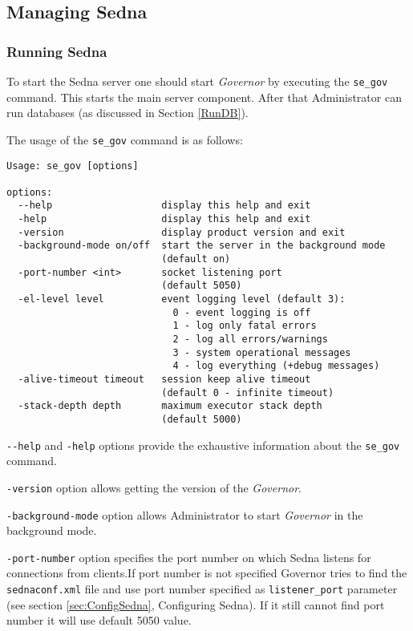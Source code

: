 \documentclass[a4paper,12pt]{article}
\begin{document}
\subsection{Managing Sedna}
\subsubsection{Running Sedna}
\label{StartSedna}

To start the Sedna server one should start \emph{Governor} by executing the
\verb!se_gov! command. This starts the main server component. After that
Administrator can run databases (as discussed in Section \ref{RunDB}).

The usage of the \verb!se_gov! command is as follows:

\begin{verbatim}
Usage: se_gov [options]

options:
  --help                   display this help and exit
  -help                    display this help and exit
  -version                 display product version and exit
  -background-mode on/off  start the server in the background mode
                           (default on)
  -port-number <int>       socket listening port
                           (default 5050)
  -el-level level          event logging level (default 3):
                             0 - event logging is off
                             1 - log only fatal errors
                             2 - log all errors/warnings
                             3 - system operational messages
                             4 - log everything (+debug messages)
  -alive-timeout timeout   session keep alive timeout
                           (default 0 - infinite timeout)
  -stack-depth depth       maximum executor stack depth
                           (default 5000)
\end{verbatim}

\verb!--help! and \verb!-help! options provide the exhaustive information about
the \verb!se_gov! command.

\verb!-version! option allows getting the version of the \emph{Governor}.

\verb!-background-mode! option allows Administrator to start \emph{Governor} in
the background mode.

\verb!-port-number! option specifies the port number on which Sedna listens for
connections from clients.If port number is not specified Governor tries to find
the \verb!sednaconf.xml! file and use port number specified as
\verb!listener_port! parameter (see section \ref{sec:ConfigSedna}, Configuring
Sedna). If it still cannot find port number it will use default 5050 value.
\end{document}

